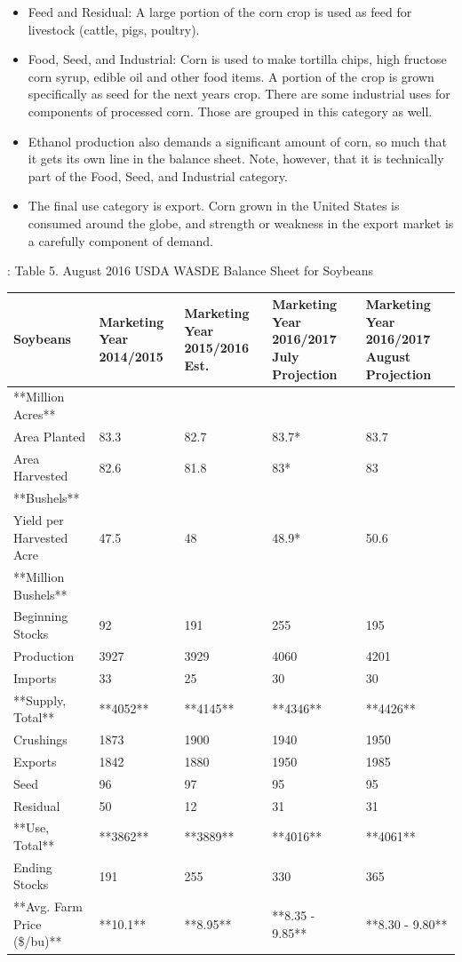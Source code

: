 \documentclass[]{book}
\providecommand{\tightlist}{%
  \setlength{\itemsep}{0pt}\setlength{\parskip}{0pt}}
\theoremstyle{definition}
\theoremstyle{definition}
\theoremstyle{remark}
\begin{document}
\begin{itemize}
\tightlist
\item
  Feed and Residual: A large portion of the corn crop is used as feed
  for livestock (cattle, pigs, poultry).
\item
  Food, Seed, and Industrial: Corn is used to make tortilla chips, high
  fructose corn syrup, edible oil and other food items. A portion of the
  crop is grown specifically as seed for the next years crop. There are
  some industrial uses for components of processed corn. Those are
  grouped in this category as well.
\item
  Ethanol production also demands a significant amount of corn, so much
  that it gets its own line in the balance sheet. Note, however, that it
  is technically part of the Food, Seed, and Industrial category.
\item
  The final use category is export. Corn grown in the United States is
  consumed around the globe, and strength or weakness in the export
  market is a carefully component of demand.
\end{itemize}

: Table 5. August 2016 USDA WASDE Balance Sheet for Soybeans

\begin{tabular}{l|l|l|l|l}
\hline
Soybeans & Marketing Year 2014/2015 & Marketing Year 2015/2016 Est. & Marketing Year 2016/2017 July Projection & Marketing Year 2016/2017 August Projection\\
\hline
**Million Acres** &  &  &  & \\
\hline
Area Planted & 83.3 & 82.7 & 83.7* & 83.7\\
\hline
Area Harvested & 82.6 & 81.8 & 83* & 83\\
\hline
**Bushels** &  &  &  & \\
\hline
Yield per Harvested Acre & 47.5 & 48 & 48.9* & 50.6\\
\hline
**Million Bushels** &  &  &  & \\
\hline
Beginning Stocks & 92 & 191 & 255 & 195\\
\hline
Production & 3927 & 3929 & 4060 & 4201\\
\hline
Imports & 33 & 25 & 30 & 30\\
\hline
**Supply, Total** & **4052** & **4145** & **4346** & **4426**\\
\hline
Crushings & 1873 & 1900 & 1940 & 1950\\
\hline
Exports & 1842 & 1880 & 1950 & 1985\\
\hline
Seed & 96 & 97 & 95 & 95\\
\hline
Residual & 50 & 12 & 31 & 31\\
\hline
**Use, Total** & **3862** & **3889** & **4016** & **4061**\\
\hline
Ending Stocks & 191 & 255 & 330 & 365\\
\hline
**Avg. Farm Price (\$/bu)** & **10.1** & **8.95** & **8.35 - 9.85** & **8.30 - 9.80**\\
\hline
\end{tabular}
\end{document}
